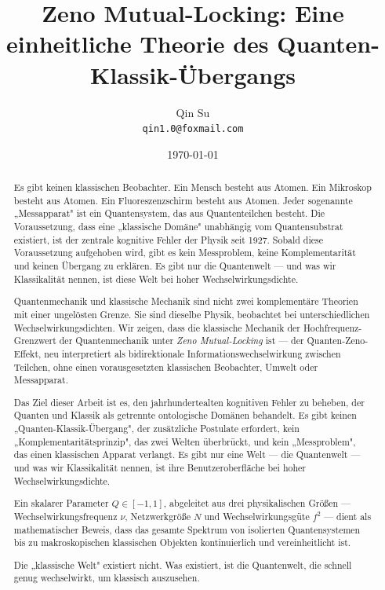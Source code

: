 \documentclass[12pt]{article}
\title{Zeno Mutual-Locking: Eine einheitliche Theorie des Quanten-Klassik-Übergangs}
\author{Qin Su \\ \texttt{qin1.0@foxmail.com}}
\date{\today}
\begin{document}
\maketitle

\begin{abstract}
Es gibt keinen klassischen Beobachter. Ein Mensch besteht aus Atomen. Ein Mikroskop besteht aus Atomen. Ein Fluoreszenzschirm besteht aus Atomen. Jeder sogenannte „Messapparat" ist ein Quantensystem, das aus Quantenteilchen besteht. Die Voraussetzung, dass eine „klassische Domäne" unabhängig vom Quantensubstrat existiert, ist der zentrale kognitive Fehler der Physik seit 1927. Sobald diese Voraussetzung aufgehoben wird, gibt es kein Messproblem, keine Komplementarität und keinen Übergang zu erklären. Es gibt nur die Quantenwelt — und was wir Klassikalität nennen, ist diese Welt bei hoher Wechselwirkungsdichte.

Quantenmechanik und klassische Mechanik sind nicht zwei komplementäre Theorien mit einer ungelösten Grenze. Sie sind dieselbe Physik, beobachtet bei unterschiedlichen Wechselwirkungsdichten. Wir zeigen, dass die klassische Mechanik der Hochfrequenz-Grenzwert der Quantenmechanik unter \textit{Zeno Mutual-Locking} ist — der Quanten-Zeno-Effekt, neu interpretiert als bidirektionale Informationswechselwirkung zwischen Teilchen, ohne einen vorausgesetzten klassischen Beobachter, Umwelt oder Messapparat.

Das Ziel dieser Arbeit ist es, den jahrhundertealten kognitiven Fehler zu beheben, der Quanten und Klassik als getrennte ontologische Domänen behandelt. Es gibt keinen „Quanten-Klassik-Übergang", der zusätzliche Postulate erfordert, kein „Komplementaritätsprinzip", das zwei Welten überbrückt, und kein „Messproblem", das einen klassischen Apparat verlangt. Es gibt nur eine Welt — die Quantenwelt — und was wir Klassikalität nennen, ist ihre Benutzeroberfläche bei hoher Wechselwirkungsdichte.

Ein skalarer Parameter $Q \in [-1, 1]$, abgeleitet aus drei physikalischen Größen — Wechselwirkungsfrequenz $\nu$, Netzwerkgröße $N$ und Wechselwirkungsgüte $f^2$ — dient als mathematischer Beweis, dass das gesamte Spektrum von isolierten Quantensystemen bis zu makroskopischen klassischen Objekten kontinuierlich und vereinheitlicht ist.

Die „klassische Welt" existiert nicht. Was existiert, ist die Quantenwelt, die schnell genug wechselwirkt, um klassisch auszusehen.
\end{abstract}
\end{document}
